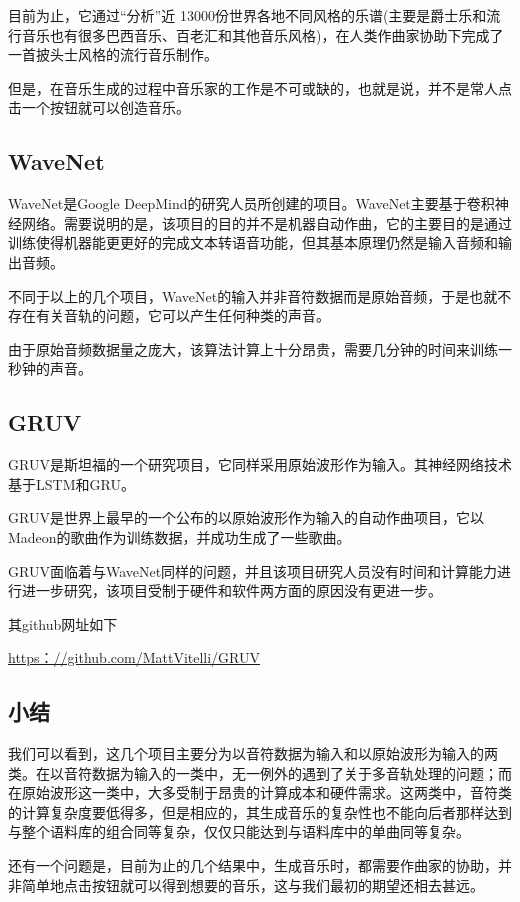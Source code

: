     目前为止，它通过“分析”近 13000份世界各地不同风格的乐谱(主要是爵士乐和流行音乐也有很多巴西音乐、百老汇和其他音乐风格)，在人类作曲家协助下完成了一首披头士风格的流行音乐制作。

    但是，在音乐生成的过程中音乐家的工作是不可或缺的，也就是说，并不是常人点击一个按钮就可以创造音乐。

    \subsection{WaveNet}
    WaveNet是Google DeepMind的研究人员所创建的项目。WaveNet主要基于卷积神经网络。需要说明的是，该项目的目的并不是机器自动作曲，它的主要目的是通过训练使得机器能更更好的完成文本转语音功能，但其基本原理仍然是输入音频和输出音频。

    不同于以上的几个项目，WaveNet的输入并非音符数据而是原始音频，于是也就不存在有关音轨的问题，它可以产生任何种类的声音。

    由于原始音频数据量之庞大，该算法计算上十分昂贵，需要几分钟的时间来训练一秒钟的声音。

    \subsection{GRUV}
    GRUV是斯坦福的一个研究项目，它同样采用原始波形作为输入。其神经网络技术基于LSTM和GRU。

    GRUV是世界上最早的一个公布的以原始波形作为输入的自动作曲项目，它以Madeon的歌曲作为训练数据，并成功生成了一些歌曲。

    GRUV面临着与WaveNet同样的问题，并且该项目研究人员没有时间和计算能力进行进一步研究，该项目受制于硬件和软件两方面的原因没有更进一步。

    其github网址如下

    \url{https：//github.com/MattVitelli/GRUV}

    \subsection{小结}
    我们可以看到，这几个项目主要分为以音符数据为输入和以原始波形为输入的两类。在以音符数据为输入的一类中，无一例外的遇到了关于多音轨处理的问题；而在原始波形这一类中，大多受制于昂贵的计算成本和硬件需求。这两类中，音符类的计算复杂度要低得多，但是相应的，其生成音乐的复杂性也不能向后者那样达到与整个语料库的组合同等复杂，仅仅只能达到与语料库中的单曲同等复杂。

    还有一个问题是，目前为止的几个结果中，生成音乐时，都需要作曲家的协助，并非简单地点击按钮就可以得到想要的音乐，这与我们最初的期望还相去甚远。
 
